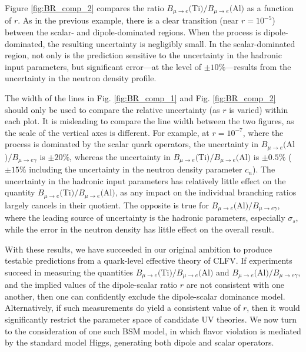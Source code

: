 \documentclass[12pt,letterpaper]{book}
\begin{document}
Figure \ref{fig:BR_comp_2} compares the ratio $B_{\mu\rightarrow e}($Ti$)/B_{\mu\rightarrow e}($Al$)$ as a function of $r$. As in the previous example, there is a clear transition (near $r=10^{-5}$) between the scalar- and dipole-dominated regions. When the process is dipole-dominated, the resulting uncertainty is negligibly small. In the scalar-dominated region, not only is the prediction sensitive to the uncertainty in the hadronic input parameters, but significant error---at the level of $\pm 10\%$---results from the uncertainty in the neutron density profile. 

The width of the lines in Fig. \ref{fig:BR_comp_1} and Fig. \ref{fig:BR_comp_2} should only be used to compare the relative uncertainty (as $r$ is varied) within each plot. It is misleading to compare the line width between the two figures, as the scale of the vertical axes is different. For example, at $r=10^{-7}$, where the process is dominated by the scalar quark operators, the uncertainty in $B_{\mu\rightarrow e}($Al$)/B_{\mu\rightarrow e\gamma}$ is $\pm 20\%$, whereas the uncertainty in $B_{\mu\rightarrow e}($Ti$)/B_{\mu\rightarrow e}($Al$)$ is $\pm 0.5\%$ ($\pm 15\%$ including the uncertainty in the neutron density parameter $c_n$). The uncertainty in the hadronic input parameters has relatively little effect on the quantity $B_{\mu\rightarrow e}($Ti$)/B_{\mu\rightarrow e}($Al$)$, as any impact on the individual branching ratios largely cancels in their quotient. The opposite is true for $B_{\mu\rightarrow e}($Al$)/B_{\mu\rightarrow e\gamma}$, where the leading source of uncertainty is the hadronic parameters, especially $\sigma_s$, while the error in the neutron density has little effect on the overall result.

With these results, we have succeeded in our original ambition to produce testable predictions from a quark-level effective theory of CLFV. If experiments succeed in measuring the quantities $B_{\mu\rightarrow e}($Ti$)/B_{\mu\rightarrow e}($Al$)$ and $B_{\mu\rightarrow e}($Al$)/B_{\mu\rightarrow e\gamma}$, and the implied values of the dipole-scalar ratio $r$ are not consistent with one another, then one can confidently exclude the dipole-scalar dominance model. Alternatively, if such measurements do yield a consistent value of $r$, then it would significantly restrict the parameter space of candidate UV theories. We now turn to the consideration of one such BSM model, in which flavor violation is mediated by the standard model Higgs, generating both dipole and scalar operators.
\end{document}
